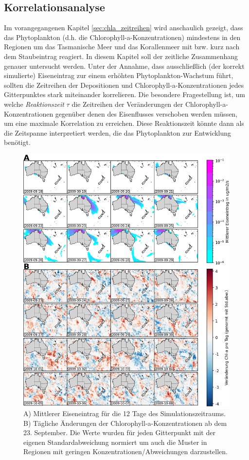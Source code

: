 \documentclass[12pt,a4paper,onecolumn]{scrartcl}
\begin{document}
\subsection{Korrelationsanalyse} \label{sec:correlation_analysis}
Im vorangegangenen Kapitel \ref{sec:chla_zeitreihen} wird anschaulich gezeigt, dass das Phytoplankton (d.h. die Chlorophyll-a-Konzentrationen) mindestens in den Regionen um das Tasmanische Meer und das Korallenmeer mit bzw. kurz nach dem Staubeintrag reagiert. In diesem Kapitel soll der zeitliche Zusammenhang genauer untersucht werden. Unter der Annahme, dass ausschließlich (der korrekt simulierte) Eiseneintrag zur einem erhöhten Phytoplankton-Wachstum führt, sollten die Zeitreihen der Depositionen und Chlorophyll-a-Konzentrationen jedes Gitterpunktes stark miteinander korrelieren. Die besondere Fragestellung ist, um welche \textit{Reaktionszeit} $\tau$ die Zeitreihen der Veränderungen der Chlorophyll-a-Konzentrationen gegenüber denen des Eisenflusses verschoben werden müssen, um eine maximale Korrelation zu erreichen. Diese Reaktionszeit könnte dann als die Zeitspanne interpretiert werden, die das Phytoplankton zur Entwicklung benötigt.
\begin{figure}
\includegraphics[width=\textwidth]{bilder/snapshot_normalized.png}
\caption{A) Mittlerer Eiseneintrag für die 12 Tage des Simulationszeitraums. B) Tägliche Änderungen der Chlorophyll-a-Konzentrationen ab dem 23. September. Die Werte wurden für jeden Gitterpunkt mit der eigenen Standardabweichung normiert um auch die Muster in Regionen mit geringen Konzentrationen/Abweichungen darzustellen.} \label{fig:snapshot_fedep_chla}
\end{figure}
\end{document}

